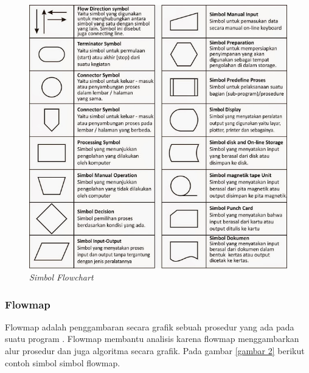 \begin{figure}[!htbp]
    \centering
    \includegraphics[scale=0.6]{figure/flowchart.jpg}
    \caption{\textit{Simbol Flowchart}}
    \label{gambar 1}
\end{figure}
\vspace{1cm}
\subsubsection{Flowmap}
Flowmap adalah penggambaran secara grafik sebuah prosedur yang ada pada suatu program \cite{rahayu2011perancangan}. Flowmap membantu analisis karena flowmap menggambarkan alur prosedur dan juga algoritma secara grafik. Pada gambar \ref{gambar 2} berikut contoh simbol simbol flowmap.

